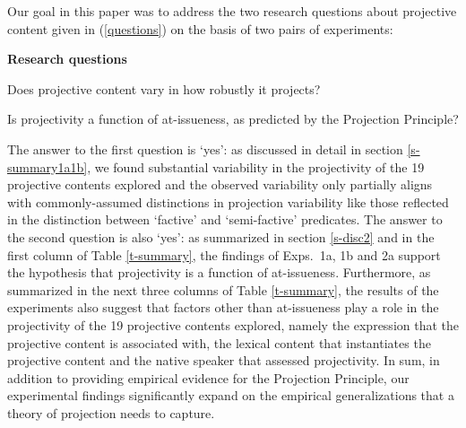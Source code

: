 \documentclass[11pt,fleqn]{article}
\newcommand{\6}{\mbox{$[\hspace*{-.6mm}[$}}
\newcommand{\9}{\mbox{$]\hspace*{-.6mm}]$}}
\begin{document}
Our goal in this paper was to address the two research questions about projective content given in (\ref{questions}) on the basis of two pairs of experiments:

\begin{exe}
\exi{(\ref{questions})} {\bf Research questions}

\begin{xlist} 

\ex Does projective content vary in how robustly it projects?

\ex Is projectivity a function of at-issueness, as predicted by the Projection Principle?
\end{xlist}

\end{exe} 
The answer to the first question is `yes': as discussed in detail in section \ref{s-summary1a1b}, we found substantial variability in the projectivity of the 19 projective contents explored and the observed variability only partially aligns with commonly-assumed distinctions in projection variability like those reflected in the distinction between `factive' and `semi-factive' predicates. The answer to the second question is also `yes': as summarized in section \ref{s-disc2} and in the first column of Table \ref{t-summary}, the findings of Exps.~1a, 1b and 2a support the hypothesis that projectivity is a function of at-issueness. Furthermore, as summarized in the next three columns of Table \ref{t-summary}, the results of the experiments also suggest that factors other than at-issueness play a role in the projectivity of the 19 projective contents explored, namely the expression that the projective content is associated with, the lexical content that instantiates the projective content and the native speaker that assessed projectivity. In sum, in addition to providing empirical evidence for the Projection Principle, our experimental findings significantly expand on the empirical generalizations that a theory of projection needs to capture.
\end{document}
